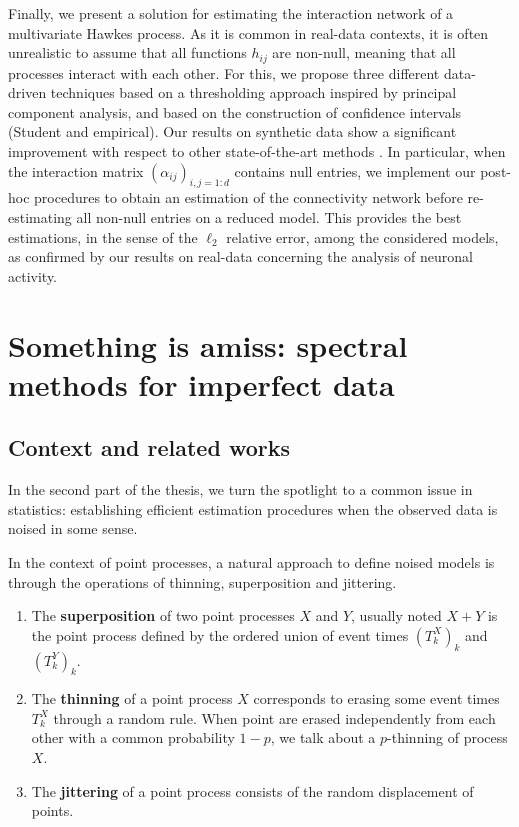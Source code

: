       Finally, we present a solution for estimating the interaction network of a multivariate Hawkes process.
      As it is common in real-data contexts, it is often unrealistic to assume that all functions $h_{ij}$ are non-null, meaning that all processes interact with each other.
      For this, we propose three different data-driven techniques based on a thresholding approach inspired by principal component analysis, and based on the construction of confidence intervals (Student and empirical).
      Our results on synthetic data show a significant improvement with respect to other state-of-the-art methods \parencite{Lemonnier2014, Bacry2020}.
      In particular, when the interaction matrix $(\alpha_{ij})_{i,j=1:d}$ contains null entries, we implement our post-hoc procedures to obtain an estimation of the connectivity network before re-estimating all non-null entries on a reduced model.
      This provides the best estimations, in the sense of the $\ell_2$ relative error, among the considered models, as confirmed by our results on real-data concerning the analysis of neuronal activity.



\section{Something is amiss: spectral methods for imperfect data}\label{sec:chap0_missing_data}
    
  \subsection{Context and related works}
  In the second part of the thesis, we turn the spotlight to a common issue in statistics: 
  establishing efficient estimation procedures when the observed data is noised in some sense.

  In the context of point processes, a natural approach to define noised models is through the operations of thinning, superposition and jittering.
  \begin{enumerate}
    \item The \textbf{superposition} of two point processes $X$ and $Y$, usually noted $X+Y$ is the point process defined by the ordered union of event times $(T_k^X)_k$ and $(T_k^Y)_k$.
    \item The \textbf{thinning} of a point process $X$ corresponds to erasing some event times $T_k^X$ through a random rule.
    When point are erased independently from each other with a common probability $1-p$, we talk about a $p$-thinning of process $X$.
    \item The \textbf{jittering} of a point process consists of the random displacement of points.
  \end{enumerate}

